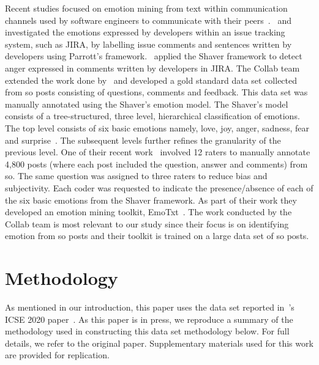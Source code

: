 Recent studies focused on emotion mining from text within communication channels used by software engineers to communicate with their peers~\citep{murgia2014, ortu2016, gachechiladze2017, novielli2018}.~\citet{murgia2014} and~\citet{ortu2016} investigated the emotions expressed by developers within an issue tracking system, such as JIRA, by labelling issue comments and sentences written by developers using Parrott's framework.~\citet{gachechiladze2017} applied the Shaver framework to detect anger expressed in comments written by developers in JIRA. The Collab team~\citep{calefato2017, novielli2018} extended the work done by~\citet{ortu2016} and developed a gold standard data set collected from \gls{so} posts consisting of questions, comments and feedback. This data set was manually annotated using the Shaver's emotion model. The Shaver's model consists of a tree-structured, three level, hierarchical classification of emotions. The top level consists of six basic emotions namely, love, joy, anger, sadness, fear and surprise~\citep{shaver1987}. The subsequent levels further refines the granularity of the previous level. One of their recent work~\citep{novielli2018} involved 12 raters to manually annotate 4,800 posts (where each post included the question, answer and comments) from \gls{so}. The same question was assigned to three raters to reduce bias and subjectivity. Each coder was requested to indicate the presence/absence of each of the six basic emotions from the Shaver framework. As part of their work they developed an emotion mining toolkit, EmoTxt~\citep{calefato2017}. The work conducted by the Collab team is most relevant to our study since their focus is on identifying emotion from \gls{so} posts and their toolkit is trained on a large data set of \gls{so} posts.



\section{Methodology}\label{semotion2020:sec:methodology}

As mentioned in our introduction, this paper uses the data set reported in~\citeauthor{Cummaudo:2020icse}'s ICSE 2020 paper~\citep{Cummaudo:2020icse}. As this paper is in press, we reproduce a summary of the methodology used in constructing this data set methodology below. For full details, we refer to the original paper. Supplementary materials used for this work are provided for replication.\footnotemark[1]

